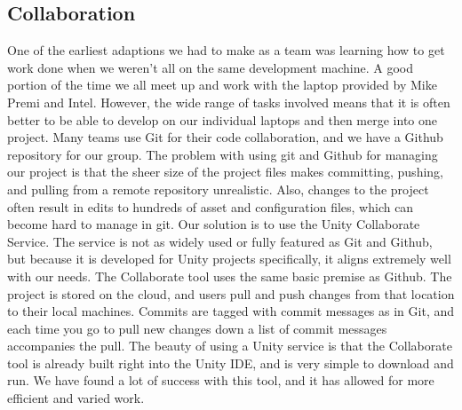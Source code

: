 \documentclass[10pt,journal,compsoc,onecolumn, draftclsnofoot]{IEEEtran}
\begin{document}
\subsection{Collaboration}
One of the earliest adaptions we had to make as a team was learning how to get work done when we weren't all on the same development machine.
A good portion of the time we all meet up and work with the laptop provided by Mike Premi and Intel.
However, the wide range of tasks involved means that it is often better to be able to develop on our individual laptops and then merge into one project.
Many teams use Git for their code collaboration, and we have a Github repository for our group.
The problem with using git and Github for managing our project is that the sheer size of the project files makes committing, pushing, and pulling from a remote repository unrealistic.
Also, changes to the project often result in edits to hundreds of asset and configuration files, which can become hard to manage in git.
Our solution is to use the Unity Collaborate Service.
The service is not as widely used or fully featured as Git and Github, but because it is developed for Unity projects specifically, it aligns extremely well with our needs.
The Collaborate tool uses the same basic premise as Github.
The project is stored on the cloud, and users pull and push changes from that location to their local machines.
Commits are tagged with commit messages as in Git, and each time you go to pull new changes down a list of commit messages accompanies the pull.
The beauty of using a Unity service is that the Collaborate tool is already built right into the Unity IDE, and is very simple to download and run.
We have found a lot of success with this tool, and it has allowed for more efficient and varied work.
\end{document}
